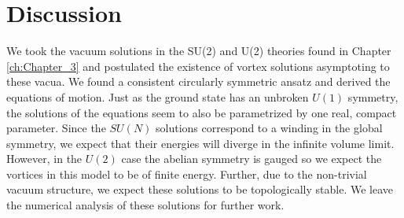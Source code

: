     \section{Discussion}
    We took the vacuum solutions in the SU(2) and U(2) theories found in Chapter \ref{ch:Chapter_3} and postulated the existence of vortex solutions asymptoting to these vacua. We found a consistent circularly symmetric ansatz and derived the equations of motion. Just as the ground state has an unbroken $U(1)$ symmetry, the solutions of the equations seem to also be parametrized by one real, compact parameter. Since the $SU(N)$ solutions correspond to a winding in the global symmetry, we expect that their energies will diverge in the infinite volume limit. However, in the $U(2)$ case the abelian symmetry is gauged so we expect the vortices in this model to be of finite energy. Further, due to the non-trivial vacuum structure, we expect these solutions to be topologically stable. We leave the numerical analysis of these solutions for further work.



